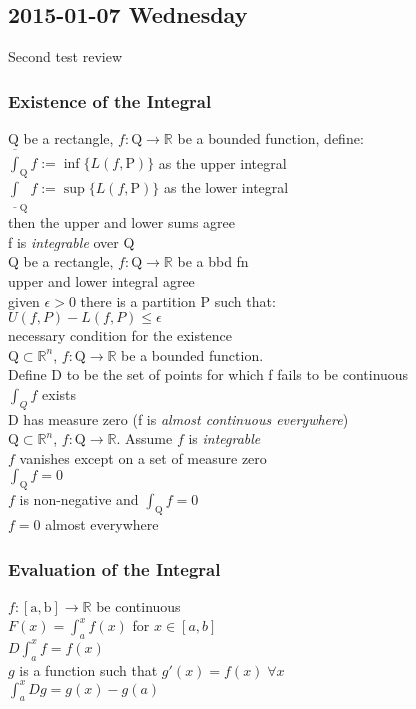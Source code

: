 
\subsection{2015-01-07 Wednesday}
Second test review
\subsubsection{Existence of the Integral}
\LET Q be a rectangle, $f:\mathrm{Q}\to\mathbb{R}$ be a bounded function, define:\\
$\overline{\int}_{\mathrm{Q}} f := \inf\{L(f, \mathrm{P})\}$ as the upper integral\\
$\underline{\int}_{\mathrm{Q}} f := \sup\{L(f, \mathrm{P})\}$ as the lower integral\\
\IF then the upper and lower sums agree\\
\THEN f is \textit{integrable} over Q\\

\LET Q be a rectangle, $f:\mathrm{Q}\to\mathbb{R}$ be a bbd fn\\
\THEN upper and lower integral agree\\
\IFF given $\epsilon>0$ there is a partition P such that:\\
$U(f,P) - L(f,P)\leq\epsilon$\\
\IDEA necessary condition for the existence\\

\LET $\mathrm{Q}\subset\mathbb{R}^n$, $f:\mathrm{Q}\to\mathbb{R}$ be a bounded function.\\
Define D to be the set of points for which f fails to be continuous\\
\THEN $\int_{Q} f$ exists\\
\IFF D has measure zero (f is \textit{almost continuous everywhere})\\

\LET $\mathrm{Q}\subset\mathbb{R}^n$, 
$f:\mathrm{Q}\to\mathbb{R}$.
Assume $f$ is \textit{integrable}\\
\IF $f$ vanishes except on a set of measure zero\\
\THEN $\int_{\mathrm{Q}}f = 0$\\
\IF $f$ is non-negative and $\int_{\mathrm{Q}}f = 0$\\
\THEN $f=0$ almost everywhere

\subsubsection{Evaluation of the Integral}
\LET $f:\mathrm{[a,b]}\to\mathbb{R}$ be continuous\\
\IF $F(x)=\int_a^xf(x)$ for $x\in[a,b]$\\
\THEN $D\int_a^xf=f(x)$\\
\IF $g$ is a function such that $g'(x)=f(x)\;\forall x$\\
\THEN $\int_a^x Dg = g(x)-g(a)$\\

